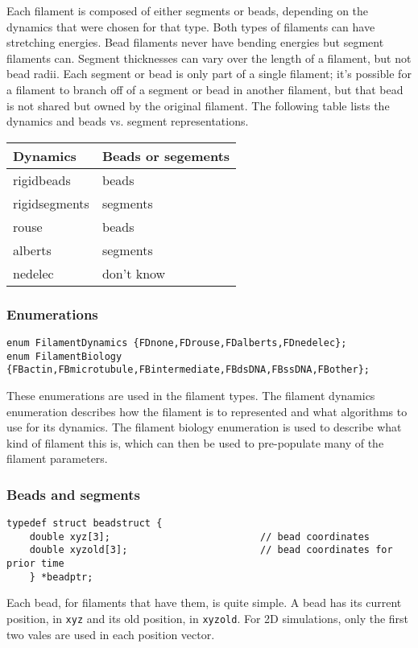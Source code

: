 \documentclass {scrbook}
\newcommand {\ttt} {\texttt}
\begin{document}
Each filament is composed of either segments or beads, depending on the dynamics that were chosen for that type. Both types of filaments can have stretching energies. Bead filaments never have bending energies but segment filaments can. Segment thicknesses can vary over the length of a filament, but not bead radii. Each segment or bead is only part of a single filament; it's possible for a filament to branch off of a segment or bead in another filament, but that bead is not shared but owned by the original filament. The following table lists the dynamics and beads vs. segment representations.

\begin{longtable}[c]{ll}
Dynamics & Beads or segements\\
\hline
rigidbeads & beads\\
rigidsegments & segments \\
rouse & beads\\
alberts & segments\\
nedelec & don't know
\end{longtable}

\subsubsection*{Enumerations}

\begin{lstlisting}
enum FilamentDynamics {FDnone,FDrouse,FDalberts,FDnedelec};
enum FilamentBiology {FBactin,FBmicrotubule,FBintermediate,FBdsDNA,FBssDNA,FBother};
\end{lstlisting}

These enumerations are used in the filament types. The filament dynamics enumeration describes how the filament is to represented and what algorithms to use for its dynamics. The filament biology enumeration is used to describe what kind of filament this is, which can then be used to pre-populate many of the filament parameters.

\subsubsection*{Beads and segments}

\begin{lstlisting}
typedef struct beadstruct {
	double xyz[3];							// bead coordinates
	double xyzold[3];						// bead coordinates for prior time
	} *beadptr;
\end{lstlisting}

Each bead, for filaments that have them, is quite simple. A bead has its current position, in \ttt{xyz} and its old position, in \ttt{xyzold}. For 2D simulations, only the first two vales are used in each position vector.
\end{document}
